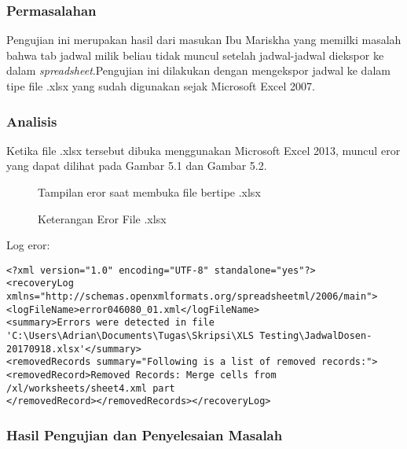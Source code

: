 \subsubsection{Permasalahan}
Pengujian ini merupakan hasil dari masukan Ibu Mariskha yang memilki masalah bahwa tab jadwal milik beliau tidak muncul setelah jadwal-jadwal diekspor ke dalam \textit{spreadsheet}.Pengujian ini dilakukan dengan mengekspor jadwal ke dalam tipe file .xlsx yang sudah digunakan sejak Microsoft Excel 2007.
\subsubsection{Analisis}
Ketika file .xlsx tersebut dibuka menggunakan Microsoft Excel 2013, muncul eror yang dapat dilihat pada Gambar 5.1 dan Gambar 5.2.
\begin{figure} [H]
	\centering  
	\caption[Tampilan eror saat membuka file bertipe .xlsx]{Tampilan eror saat membuka file bertipe .xlsx} 
	\label{fig:flow-chart-CodeIgniter} 
\end{figure}

\begin{figure} [H]
	\centering  
	\caption[Keterangan Eror File .xlsx]{Keterangan Eror File .xlsx} 
	\label{fig:flow-chart-CodeIgniter} 
\end{figure}

Log eror:
\begin{lstlisting}
<?xml version="1.0" encoding="UTF-8" standalone="yes"?>
<recoveryLog xmlns="http://schemas.openxmlformats.org/spreadsheetml/2006/main">
<logFileName>error046080_01.xml</logFileName>
<summary>Errors were detected in file 'C:\Users\Adrian\Documents\Tugas\Skripsi\XLS Testing\JadwalDosen-20170918.xlsx'</summary>
<removedRecords summary="Following is a list of removed records:"><removedRecord>Removed Records: Merge cells from /xl/worksheets/sheet4.xml part
</removedRecord></removedRecords></recoveryLog>
\end{lstlisting}

\subsubsection{Hasil Pengujian dan Penyelesaian Masalah} 
